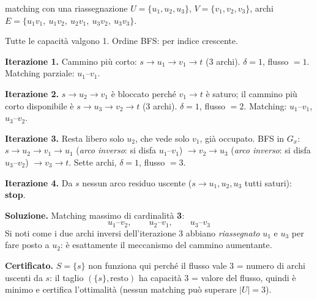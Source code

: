 \documentclass[11pt,a4paper]{article}
\begin{document}
\begin{es}{matching con una riassegnazione}
$U = \{u_1,u_2,u_3\}$, $V = \{v_1,v_2,v_3\}$, archi
$E = \{u_1v_1,\ u_1v_2,\ u_2v_1,\ u_3v_2,\ u_3v_3\}$.

\begin{center}
\end{center}
Tutte le capacità valgono 1. Ordine BFS: per indice crescente.

\textbf{Iterazione 1.} Cammino più corto: $s \to u_1 \to v_1 \to t$ (3 archi). $\delta = 1$,
flusso $=1$. Matching parziale: $u_1$--$v_1$.

\textbf{Iterazione 2.} $s\to u_2 \to v_1$ è bloccato perché $v_1\to t$ è saturo;
il cammino più corto disponibile è $s \to u_3 \to v_2 \to t$ (3 archi). $\delta=1$, flusso $=2$.
Matching: $u_1$--$v_1$, $u_3$--$v_2$.

\textbf{Iterazione 3.} Resta libero solo $u_2$, che vede solo $v_1$, già occupato.
BFS in $G_x$: $s \to u_2 \to v_1 \to u_1$ (\emph{arco inverso}: si disfa $u_1$--$v_1$)
$\to v_2 \to u_3$ (\emph{arco inverso}: si disfa $u_3$--$v_2$) $\to v_3 \to t$.
Sette archi, $\delta = 1$, flusso $= 3$.

\textbf{Iterazione 4.} Da $s$ nessun arco residuo uscente ($s\to u_1,u_2,u_3$ tutti saturi):
\textbf{stop}.

\medskip
\textbf{Soluzione.} Matching massimo di cardinalità \textbf{3}:
\[ u_1\text{--}v_2, \qquad u_2\text{--}v_1, \qquad u_3\text{--}v_3 \]
Si noti come i due archi inversi dell'iterazione 3 abbiano \emph{riassegnato} $u_1$ e $u_3$
per fare posto a $u_2$: è esattamente il meccanismo del cammino aumentante.

\textbf{Certificato.} $S=\{s\}$ non funziona qui perché il flusso vale 3 = numero di archi
uscenti da $s$: il taglio $(\{s\},\text{resto})$ ha capacità 3 = valore del flusso, quindi è
minimo e certifica l'ottimalità (nessun matching può superare $|U| = 3$).
\end{es}
\end{document}
